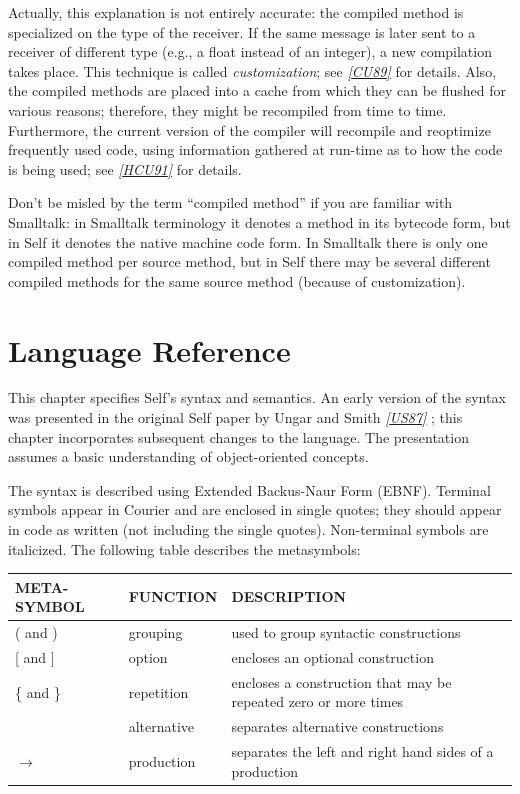 \documentclass[letterpaper,10pt,english]{sphinxmanual}
\begin{document}
Actually, this explanation is not entirely accurate: the compiled method is specialized on the type of the receiver. If the same message is later sent to a receiver of different type (e.g., a float instead of an integer), a new compilation takes place. This technique is called \emph{customization}; see {\hyperref[ref:citations]{\emph{{[}CU89{]}}}} for details. Also, the compiled methods are placed into a cache from which they can be flushed for various reasons; therefore, they might be recompiled from time to time. Furthermore, the current version of the compiler will recompile and reoptimize frequently used code, using information gathered at run-time as to how the code is being used; see {\hyperref[ref:citations]{\emph{{[}HCU91{]}}}} for details.

Don’t be misled by the term “compiled method” if you are familiar with Smalltalk: in Smalltalk terminology it denotes a method in its bytecode form, but in Self it denotes the native machine code form. In Smalltalk there is only one compiled method per source method, but in Self there may be several different compiled methods for the same source method (because of customization).


\chapter{Language Reference}
\label{langref:language-reference}\label{langref::doc}
This chapter specifies Self’s syntax and semantics. An early version of the syntax was presented
in the original Self paper by Ungar and Smith {\hyperref[ref:citations]{\emph{{[}US87{]}}}} ; this chapter incorporates subsequent
changes to the language. The presentation assumes a basic understanding of object-oriented concepts.

The syntax is described using Extended Backus-Naur Form (EBNF). Terminal symbols appear in
Courier and are enclosed in single quotes; they should appear in code as written (not including
the single quotes). Non-terminal symbols are italicized. The following table describes the metasymbols:

\begin{tabulary}{\linewidth}{|L|L|L|}
\hline

META-SYMBOL
 & 
FUNCTION
 & 
DESCRIPTION
\\\hline

( and )
 & 
grouping
 & 
used to group syntactic constructions
\\\hline

{[} and {]}
 & 
option
 & 
encloses an optional construction
\\\hline

\{ and \}
 & 
repetition
 & 
encloses a construction that may be repeated zero or more times
\\\hline

\textbar{}
 & 
alternative
 & 
separates alternative constructions
\\\hline

\(\rightarrow\)
 & 
production
 & 
separates the left and right hand sides of a production
\\\hline
\end{tabulary}
\end{document}
